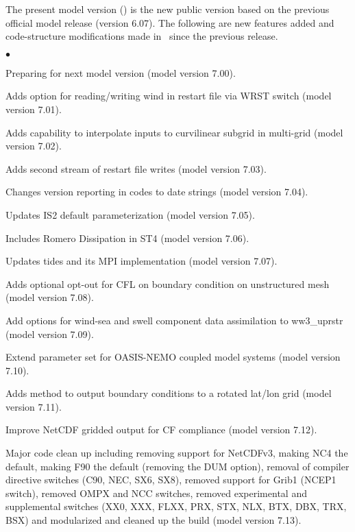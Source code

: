 \vspace{\baselineskip} 
\noindent 
The present model version (\WWver) is the new public version based on the
previous official model release (version 6.07). The following are new features added 
and code-structure modifications made in \ws\ \WWver since the previous release.

\begin{list}{$\bullet$}{\rightmargin 5mm \parsep 0mm \itemsep 0mm}

\item Preparing for next model version (model version 7.00).

\item Adds option for reading/writing wind in restart file via WRST switch (model version 7.01).

\item Adds capability to interpolate inputs to curvilinear subgrid in multi-grid  (model version 7.02).

\item Adds second stream of restart file writes (model version 7.03).

\item Changes version reporting in codes to date strings (model version 7.04).

\item Updates IS2 default parameterization (model version 7.05).

\item Includes Romero Dissipation in ST4 (model version 7.06).

\item Updates tides and its MPI implementation (model version 7.07).

\item Adds optional opt-out for CFL on boundary condition on unstructured mesh (model version 7.08).

\item Add options for wind-sea and swell component data assimilation to ww3\_uprstr (model version 7.09).

\item Extend parameter set for OASIS-NEMO coupled model systems (model version 7.10).

\item Adds method to output boundary conditions to a rotated lat/lon grid (model version 7.11).

\item Improve NetCDF gridded output for CF compliance (model version 7.12).

\item Major code clean up including removing support for NetCDFv3, making NC4 the default, 
      making F90 the default (removing the DUM option), removal of compiler directive 
      switches (C90, NEC, SX6, SX8), removed support for Grib1 (NCEP1 switch), removed OMPX 
      and NCC switches, removed experimental and supplemental switches (XX0, XXX, FLXX, PRX, 
      STX, NLX, BTX, DBX, TRX, BSX) and modularized and cleaned up the build (model version 7.13).

\end{list}

